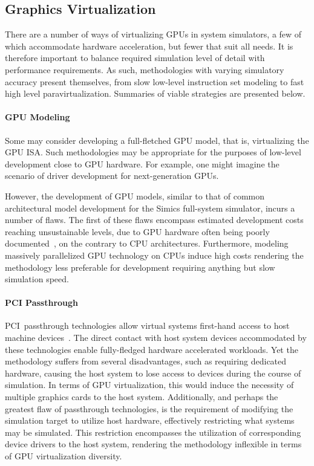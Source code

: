 \subsection{Graphics Virtualization}
\label{sec:previousresearch_graphicsvirtualization}
There are a number of ways of virtualizing GPUs in system simulators, a few of which accommodate hardware acceleration, but fewer that suit all needs.
It is therefore important to balance required simulation level of detail with performance requirements.
As such, methodologies with varying simulatory accuracy present themselves, from slow low-level instruction set modeling to fast high level paravirtualization.
Summaries of viable strategies are presented below.

\paragraph{GPU Modeling}
\label{par:previousresearch_graphicsvirtualization_gpumodeling}
Some may consider developing a full-fletched GPU model, that is, virtualizing the GPU ISA.
Such methodologies may be appropriate for the purposes of low-level development close to GPU hardware.
For example, one might imagine the scenario of driver development for next-generation GPUs.

However, the development of GPU models, similar to that of common architectural model development for the Simics full-system simulator, incurs a number of flaws.
The first of these flaws encompass estimated development costs reaching unsustainable levels, due to GPU hardware often being poorly documented~, on the contrary to CPU architectures.
Furthermore, modeling massively parallelized GPU technology on CPUs induce high costs rendering the methodology less preferable for development requiring anything but slow simulation speed.

\paragraph{PCI Passthrough}
\label{par:previousresearch_graphicsvirtualization_pcipassthrough}
PCI~passthrough technologies allow virtual systems first-hand access to host machine devices~.
The direct contact with host system devices accommodated by these technologies enable fully-fledged hardware accelerated workloads.
Yet the methodology suffers from several disadvantages, such as requiring dedicated hardware, causing the host system to lose access to devices during the course of simulation.
In terms of GPU virtualization, this would induce the necessity of multiple graphics cards to the host system.
Additionally, and perhaps the greatest flaw of passthrough technologies, is the requirement of modifying the simulation target to utilize host hardware, effectively restricting what systems may be simulated.
This restriction encompasses the utilization of corresponding device drivers to the host system, rendering the methodology inflexible in terms of GPU virtualization diversity.

